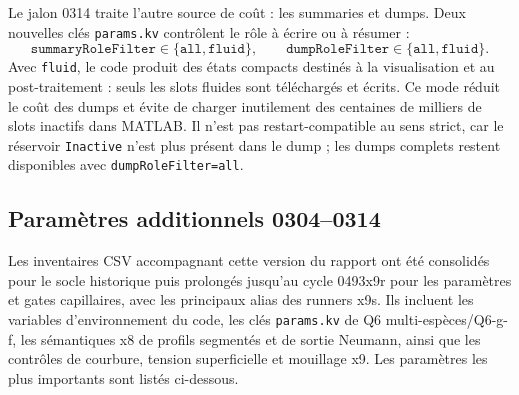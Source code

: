 \documentclass[11pt,a4paper]{article}
\begin{document}
Le jalon 0314 traite l'autre source de coût : les summaries et dumps. Deux nouvelles clés \texttt{params.kv} contrôlent le rôle à écrire ou à résumer :
\begin{equation}
  \texttt{summaryRoleFilter} \in \{\texttt{all},\texttt{fluid}\}, \qquad
  \texttt{dumpRoleFilter} \in \{\texttt{all},\texttt{fluid}\}.
\end{equation}
Avec \texttt{fluid}, le code produit des états compacts destinés à la visualisation et au post-traitement : seuls les slots fluides sont téléchargés et écrits. Ce mode réduit le coût des dumps et évite de charger inutilement des centaines de milliers de slots inactifs dans MATLAB. Il n'est pas restart-compatible au sens strict, car le réservoir \texttt{Inactive} n'est plus présent dans le dump ; les dumps complets restent disponibles avec \texttt{dumpRoleFilter=all}.

\subsection{Paramètres additionnels 0304--0314}

Les inventaires CSV accompagnant cette version du rapport ont été consolidés pour le socle historique puis prolongés jusqu'au cycle 0493x9r pour les paramètres et gates capillaires, avec les principaux alias des runners x9s. Ils incluent les variables d'environnement du code, les clés \texttt{params.kv} de Q6 multi-espèces/Q6-g-f, les sémantiques x8 de profils segmentés et de sortie Neumann, ainsi que les contrôles de courbure, tension superficielle et mouillage x9. Les paramètres les plus importants sont listés ci-dessous.
\end{document}
